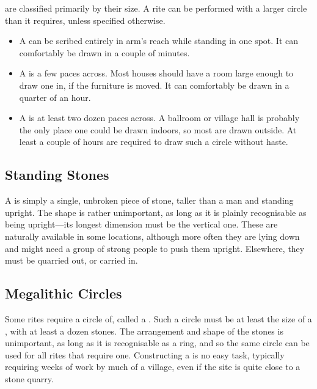  are classified primarily by their size.
A rite can be performed with a larger circle than it requires, unless specified otherwise.
\begin{itemize}
	\item A  can be scribed entirely in arm's reach while standing in one spot.
		It can comfortably be drawn in a couple of minutes.
	\item A  is a few paces across.
		Most houses should have a room large enough to draw one in, if the furniture is moved.
		It can comfortably be drawn in a quarter of an hour.
	\item A  is at least two dozen paces across.
		A ballroom or village hall is probably the only place one could be drawn indoors, so most are drawn outside.
		At least a couple of hours are required to draw such a circle without haste.
\end{itemize}

\subsection{Standing Stones}

A  is simply a single, unbroken piece of stone, taller than a man and standing upright.
The shape is rather unimportant, as long as it is plainly recognisable as being upright---its longest dimension must be the vertical one.
These are naturally available in some locations, although more often they are lying down and might need a group of strong people to push them upright.
Elsewhere, they must be quarried out, or carried in.

\subsection{Megalithic Circles}

Some rites require a circle of, called a .
Such a circle must be at least the size of a , with at least a dozen stones.
The arrangement and shape of the stones is unimportant, as long as it is recognisable as a ring, and so the same circle can be used for all rites that require one.
Constructing a  is no easy task, typically requiring weeks of work by much of a village, even if the site is quite close to a stone quarry.

